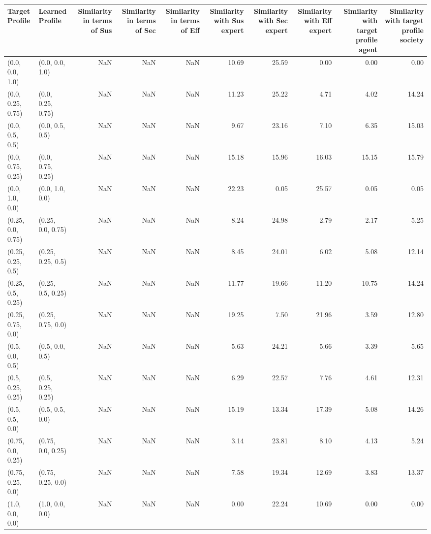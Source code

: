 \begin{tabular}{llrrrrrrrr}
\toprule
Target Profile & Learned Profile & Similarity in terms of Sus & Similarity in terms of Sec & Similarity in terms of Eff & Similarity with Sus expert & Similarity with Sec expert & Similarity with Eff expert & Similarity with target profile agent & Similarity with target profile society \\
\midrule
(0.0, 0.0, 1.0) & (0.0, 0.0, 1.0) & NaN & NaN & NaN & 10.69 & 25.59 & 0.00 & 0.00 & 0.00 \\
(0.0, 0.25, 0.75) & (0.0, 0.25, 0.75) & NaN & NaN & NaN & 11.23 & 25.22 & 4.71 & 4.02 & 14.24 \\
(0.0, 0.5, 0.5) & (0.0, 0.5, 0.5) & NaN & NaN & NaN & 9.67 & 23.16 & 7.10 & 6.35 & 15.03 \\
(0.0, 0.75, 0.25) & (0.0, 0.75, 0.25) & NaN & NaN & NaN & 15.18 & 15.96 & 16.03 & 15.15 & 15.79 \\
(0.0, 1.0, 0.0) & (0.0, 1.0, 0.0) & NaN & NaN & NaN & 22.23 & 0.05 & 25.57 & 0.05 & 0.05 \\
(0.25, 0.0, 0.75) & (0.25, 0.0, 0.75) & NaN & NaN & NaN & 8.24 & 24.98 & 2.79 & 2.17 & 5.25 \\
(0.25, 0.25, 0.5) & (0.25, 0.25, 0.5) & NaN & NaN & NaN & 8.45 & 24.01 & 6.02 & 5.08 & 12.14 \\
(0.25, 0.5, 0.25) & (0.25, 0.5, 0.25) & NaN & NaN & NaN & 11.77 & 19.66 & 11.20 & 10.75 & 14.24 \\
(0.25, 0.75, 0.0) & (0.25, 0.75, 0.0) & NaN & NaN & NaN & 19.25 & 7.50 & 21.96 & 3.59 & 12.80 \\
(0.5, 0.0, 0.5) & (0.5, 0.0, 0.5) & NaN & NaN & NaN & 5.63 & 24.21 & 5.66 & 3.39 & 5.65 \\
(0.5, 0.25, 0.25) & (0.5, 0.25, 0.25) & NaN & NaN & NaN & 6.29 & 22.57 & 7.76 & 4.61 & 12.31 \\
(0.5, 0.5, 0.0) & (0.5, 0.5, 0.0) & NaN & NaN & NaN & 15.19 & 13.34 & 17.39 & 5.08 & 14.26 \\
(0.75, 0.0, 0.25) & (0.75, 0.0, 0.25) & NaN & NaN & NaN & 3.14 & 23.81 & 8.10 & 4.13 & 5.24 \\
(0.75, 0.25, 0.0) & (0.75, 0.25, 0.0) & NaN & NaN & NaN & 7.58 & 19.34 & 12.69 & 3.83 & 13.37 \\
(1.0, 0.0, 0.0) & (1.0, 0.0, 0.0) & NaN & NaN & NaN & 0.00 & 22.24 & 10.69 & 0.00 & 0.00 \\
\bottomrule
\end{tabular}
